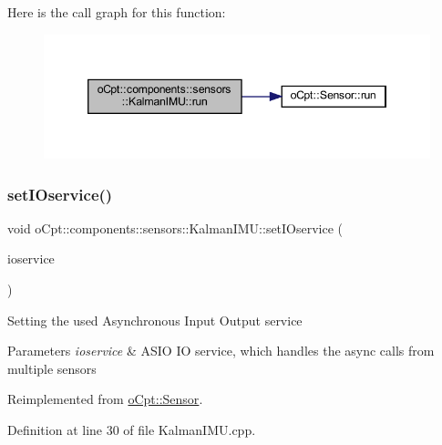 Here is the call graph for this function\+:
\nopagebreak
\begin{figure}[H]
\begin{center}
\leavevmode
\includegraphics[width=346pt]{classo_cpt_1_1components_1_1sensors_1_1_kalman_i_m_u_abd725cf96ffa29379c496bed243a520a_cgraph}
\end{center}
\end{figure}
\hypertarget{classo_cpt_1_1components_1_1sensors_1_1_kalman_i_m_u_a21cf83dfed3bd1c5a164bb847d25f426}{}\label{classo_cpt_1_1components_1_1sensors_1_1_kalman_i_m_u_a21cf83dfed3bd1c5a164bb847d25f426} 
\subsubsection{\texorpdfstring{set\+I\+Oservice()}{setIOservice()}}
{\footnotesize\ttfamily void o\+Cpt\+::components\+::sensors\+::\+Kalman\+I\+M\+U\+::set\+I\+Oservice (\begin{DoxyParamCaption}\item[{boost\+::shared\+\_\+ptr$<$ boost\+::asio\+::io\+\_\+service $>$}]{ioservice }\end{DoxyParamCaption})\hspace{0.3cm}{\ttfamily [virtual]}}

Setting the used Asynchronous Input Output service 
\begin{DoxyParams}{Parameters}
{\em ioservice} & A\+S\+IO IO service, which handles the async calls from multiple sensors \\
\hline
\end{DoxyParams}


Reimplemented from \hyperlink{classo_cpt_1_1_sensor_ae7d47e18df5eb7854bf71fbbee9568df}{o\+Cpt\+::\+Sensor}.



Definition at line 30 of file Kalman\+I\+M\+U.\+cpp.



